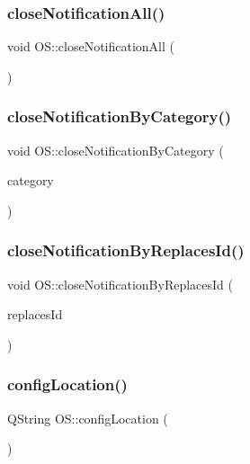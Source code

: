 \mbox{\label{classOS_a16c6da56d519e2c2bccbdeaf5c4ff29b}} 
\subsubsection{\texorpdfstring{closeNotificationAll()}{closeNotificationAll()}}
{\footnotesize\ttfamily void O\+S\+::close\+Notification\+All (\begin{DoxyParamCaption}{ }\end{DoxyParamCaption})}

\mbox{\label{classOS_a8ab936784f48408f14ad73f10ae5afb8}} 
\subsubsection{\texorpdfstring{closeNotificationByCategory()}{closeNotificationByCategory()}}
{\footnotesize\ttfamily void O\+S\+::close\+Notification\+By\+Category (\begin{DoxyParamCaption}\item[{Q\+String}]{category }\end{DoxyParamCaption})}

\mbox{\label{classOS_a8cc3c6824e01ae679819c8c3daf7842e}} 
\subsubsection{\texorpdfstring{closeNotificationByReplacesId()}{closeNotificationByReplacesId()}}
{\footnotesize\ttfamily void O\+S\+::close\+Notification\+By\+Replaces\+Id (\begin{DoxyParamCaption}\item[{Q\+String}]{replaces\+Id }\end{DoxyParamCaption})}

\mbox{\label{classOS_ae319d1766558e1a93f0d2736d7f898b2}} 
\subsubsection{\texorpdfstring{configLocation()}{configLocation()}}
{\footnotesize\ttfamily Q\+String O\+S\+::config\+Location (\begin{DoxyParamCaption}{ }\end{DoxyParamCaption})}

